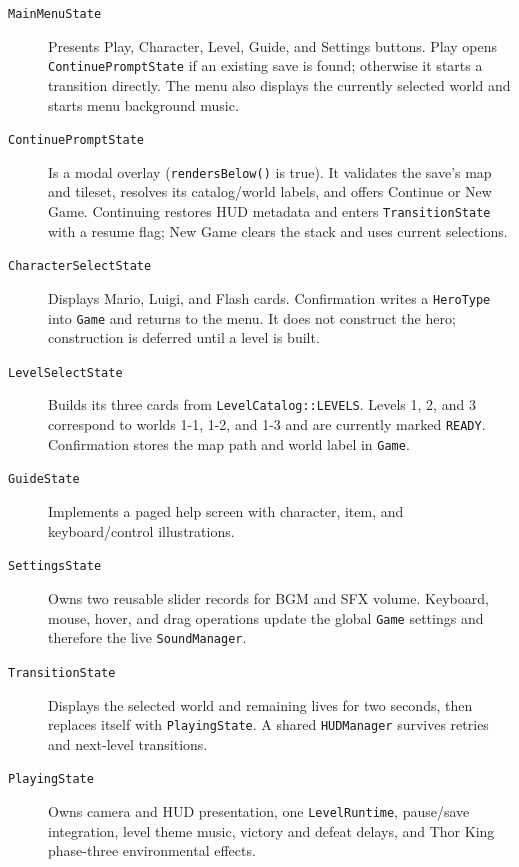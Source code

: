 \begin{description}
    \item[\texttt{MainMenuState}] Presents Play, Character, Level, Guide, and
    Settings buttons.  Play opens \texttt{ContinuePromptState} if an existing
    save is found; otherwise it starts a transition directly.  The menu also
    displays the currently selected world and starts menu background music.

    \item[\texttt{ContinuePromptState}] Is a modal overlay
    (\texttt{rendersBelow()} is true).  It validates the save's map and tileset,
    resolves its catalog/world labels, and offers Continue or New Game.
    Continuing restores HUD metadata and enters \texttt{TransitionState} with
    a resume flag; New Game clears the stack and uses current selections.

    \item[\texttt{CharacterSelectState}] Displays Mario, Luigi, and Flash cards.
    Confirmation writes a \texttt{HeroType} into \texttt{Game} and returns to
    the menu.  It does not construct the hero; construction is deferred until
    a level is built.

    \item[\texttt{LevelSelectState}] Builds its three cards from
    \texttt{LevelCatalog::LEVELS}.  Levels 1, 2, and 3 correspond to worlds
    1-1, 1-2, and 1-3 and are currently marked \texttt{READY}.  Confirmation
    stores the map path and world label in \texttt{Game}.

    \item[\texttt{GuideState}] Implements a paged help screen with character,
    item, and keyboard/control illustrations.

    \item[\texttt{SettingsState}] Owns two reusable slider records for BGM and
    SFX volume.  Keyboard, mouse, hover, and drag operations update the global
    \texttt{Game} settings and therefore the live \texttt{SoundManager}.

    \item[\texttt{TransitionState}] Displays the selected world and remaining
    lives for two seconds, then replaces itself with \texttt{PlayingState}.  A
    shared \texttt{HUDManager} survives retries and next-level transitions.

    \item[\texttt{PlayingState}] Owns camera and HUD presentation, one
    \texttt{LevelRuntime}, pause/save integration, level theme music, victory
    and defeat delays, and Thor King phase-three environmental effects.


\end{description}
